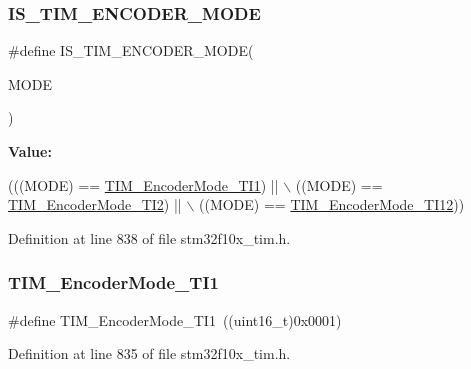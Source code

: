 \subsubsection{\texorpdfstring{I\+S\+\_\+\+T\+I\+M\+\_\+\+E\+N\+C\+O\+D\+E\+R\+\_\+\+M\+O\+DE}{IS\_TIM\_ENCODER\_MODE}}
{\footnotesize\ttfamily \#define I\+S\+\_\+\+T\+I\+M\+\_\+\+E\+N\+C\+O\+D\+E\+R\+\_\+\+M\+O\+DE(\begin{DoxyParamCaption}\item[{}]{M\+O\+DE }\end{DoxyParamCaption})}

{\bfseries Value\+:}
\begin{DoxyCode}
(((MODE) == \hyperlink{group___t_i_m___encoder___mode_gabc63e3617a938382f87439ec58768b8e}{TIM\_EncoderMode\_TI1}) || \(\backslash\)
                                   ((MODE) == \hyperlink{group___t_i_m___encoder___mode_ga5627a2d5d47b7301c7dbb29d20ae00e3}{TIM\_EncoderMode\_TI2}) || \(\backslash\)
                                   ((MODE) == \hyperlink{group___t_i_m___encoder___mode_ga12511f903de08f1a634ff7828757f081}{TIM\_EncoderMode\_TI12}))
\end{DoxyCode}


Definition at line 838 of file stm32f10x\+\_\+tim.\+h.

\mbox{\label{group___t_i_m___encoder___mode_gabc63e3617a938382f87439ec58768b8e}} 
\subsubsection{\texorpdfstring{T\+I\+M\+\_\+\+Encoder\+Mode\+\_\+\+T\+I1}{TIM\_EncoderMode\_TI1}}
{\footnotesize\ttfamily \#define T\+I\+M\+\_\+\+Encoder\+Mode\+\_\+\+T\+I1~((uint16\+\_\+t)0x0001)}



Definition at line 835 of file stm32f10x\+\_\+tim.\+h.

\mbox{\label{group___t_i_m___encoder___mode_ga12511f903de08f1a634ff7828757f081}} 
